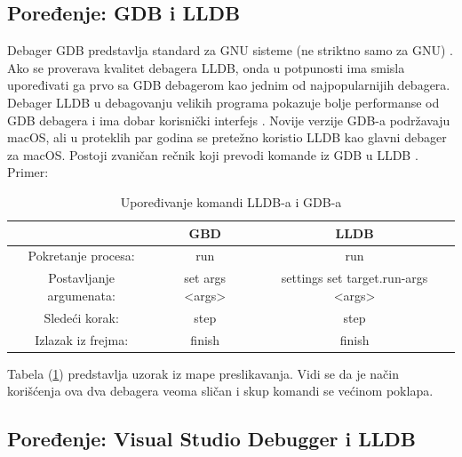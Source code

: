 \documentclass[a4paper]{article}
\begin{document}
\subsection{Poređenje: GDB i LLDB}
\label{subsec: GDB i LLDB}

Debager GDB predstavlja standard za GNU sisteme (ne striktno samo za GNU) \cite{gdb}. Ako se proverava kvalitet debagera LLDB, onda u potpunosti ima smisla upoređivati ga prvo sa GDB debagerom kao jednim od najpopularnijih debagera. Debager LLDB u debagovanju velikih programa pokazuje bolje performanse od GDB debagera i ima dobar korisnički interfejs \cite{lldb_project_blog}. Novije verzije GDB-a podržavaju macOS, ali u proteklih par godina se pretežno koristio LLDB kao glavni debager za macOS. Postoji zvaničan rečnik koji prevodi komande iz GDB u LLDB \cite {lldb_to_gdb_map}. Primer:

\begin{table}
	\begin{center}
	  \caption{Upoređivanje komandi LLDB-a i GDB-a}
	  \label{tab:tabela_lldb_i_gdb} 
	  \begin{tabular}{| c | c | c |}
	  	\hline
	    & \cellcolor{red!60}GBD & \cellcolor{red!60}LLDB \\ 
	    \hline
	    \cellcolor{orange!60}Pokretanje procesa: & \cellcolor{yellow!60}run & \cellcolor{yellow!60}run \\ 
	    \hline 
	    \cellcolor{orange!60}Postavljanje argumenata: & \cellcolor{yellow!60}set args <args>
	    & \cellcolor{yellow!60}settings set target.run-args <args> \\
	    \hline
	    \cellcolor{orange!60}Sledeći korak: & \cellcolor{yellow!60}step & \cellcolor{yellow!60}step \\
	    \hline
	    \cellcolor{orange!60}Izlazak iz frejma: & \cellcolor{yellow!60}finish & \cellcolor{yellow!60}finish\\
	    \hline
	  \end{tabular}
	\end{center}
\end{table}

\indent Tabela (\ref{tab:tabela_lldb_i_gdb}) predstavlja uzorak iz mape preslikavanja. Vidi se da je način korišćenja ova dva debagera veoma sličan i skup komandi se većinom poklapa. 

\subsection{Poređenje: Visual Studio Debugger i LLDB}
\label{subsec: Visual Studio Debugger i LLDB}
\end{document}
